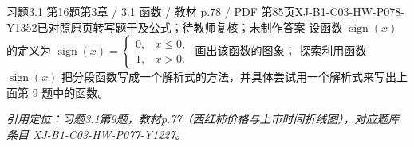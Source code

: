 \par\noindent\begin{minipage}{\linewidth}
\begin{bankitem}{习题3.1 第16题}{第3章 / 3.1 函数 / 教材 p.78 / PDF 第85页}{XJ-B1-C03-HW-P078-Y1352}{已对照原页转写题干及公式；待教师复核；未制作答案}
设函数 $\operatorname{sign}(x)$ 的定义为 $\operatorname{sign}(x)=\begin{cases}0,&x\le0,\\1,&x>0.\end{cases}$
画出该函数的图象；
探索利用函数 $\operatorname{sign}(x)$ 把分段函数写成一个解析式的方法，并具体尝试用一个解析式来写出上面第 9 题中的函数。
\par\textit{引用定位：习题3.1第9题，教材p.77（西红柿价格与上市时间折线图），对应题库条目 XJ-B1-C03-HW-P077-Y1227。}
\end{bankitem}
\end{minipage}\par\medskip
